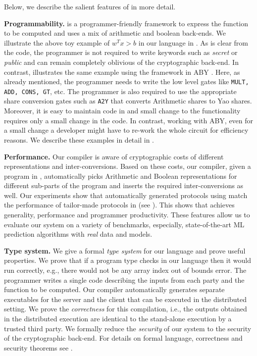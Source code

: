 Below, we describe the salient features of \tool in more detail.


\textbf{Programmability.} \tool is a programmer-friendly framework to
express the function to be computed and uses a mix of arithmetic and
boolean \mpc back-ends. We illustrate the above toy example of $w^Tx
>b$ in our language in . As is clear from the code,
the programmer is not required to write keywords such as {\em secret}
or {\em public} and can remain completely oblivious of the
cryptographic back-end. In contrast,  illustrates
the same example using the framework in ABY \cite{aby}. Here, as
already mentioned, the programmer needs to write the low level gates
like {\tt MULT, ADD, CONS, GT}, etc. The programmer is also required
to use the appropriate share conversion gates such as {\tt A2Y} that
converts Arithmetic shares to Yao shares. Moreover, it is easy to
maintain code in \tool and small change to the functionality requires
only a small change in the code. In contrast, working with ABY, even
for a small change a developer might have to re-work the whole circuit
for efficiency reasons. We describe these examples in detail in
.

\textbf{Performance.} Our compiler is aware of cryptographic costs of different representations and inter-conversions.  Based on these costs, our compiler, given a program in \tool, automatically picks Arithmetic and Boolean representations for different sub-parts of the program and inserts the required inter-conversions as well. 
Our experiments show that automatically generated protocols using \tool match the performance of tailor-made protocols in \cite{minionn,shafindss} (see ). This shows that  \tool achieves generality, performance and programmer productivity. These features allow us to evaluate our system on a variety of benchmarks, especially, state-of-the-art ML prediction algorithms with \emph{real} data and models. 

\textbf{Type system.} We give a formal {\em type system} for our language and prove useful properties. We prove that if a program type checks in our language then it would run correctly, e.g., there would not be any array index out of bounds error. The programmer writes a single code describing the inputs from each party and the function to be computed. Our compiler automatically generates separate executables for the server and the client that can be executed in the distributed setting. We prove the {\em correctness} for this compilation, i.e., the outputs obtained in the distributed execution are identical to the stand-alone execution by a trusted third party. We formally reduce the {\em security} of our system to the security of the cryptographic back-end. For details on formal language, correctness and security theorems see .


